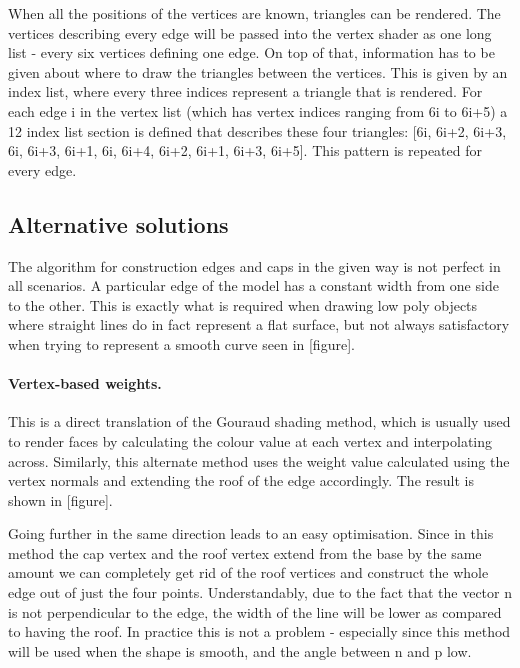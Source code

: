 \documentclass[a4paper, 12pt]{article}
\begin{document}
When all the positions of the vertices are known, triangles can be rendered. The vertices describing every edge will be passed into the vertex shader as one long list - every six vertices defining one edge. On top of that, information has to be given about where to draw the triangles between the vertices. This is given by an index list, where every three indices represent a triangle that is rendered. For each edge i in the vertex list (which has vertex indices ranging from 6i to 6i+5) a 12 index list section is defined that describes these four triangles: [6i, 6i+2, 6i+3, 6i, 6i+3, 6i+1, 6i, 6i+4, 6i+2, 6i+1, 6i+3, 6i+5]. This pattern is repeated for every edge.


\subsection{Alternative solutions}

The algorithm for construction edges and caps in the given way is not perfect in all scenarios. A particular edge of the model has a constant width from one side to the other. This is exactly what is required when drawing low poly objects where straight lines do in fact represent a flat surface, but not always satisfactory when trying to represent a smooth curve seen in [figure].

\paragraph{Vertex-based weights.}
This is a direct translation of the Gouraud shading method, which is usually used to render faces by calculating the colour value at each vertex and interpolating across. Similarly, this alternate method uses the weight value calculated using the vertex normals and extending the roof of the edge accordingly. The result is shown in [figure].

Going further in the same direction leads to an easy optimisation. Since in this method the cap vertex and the roof vertex extend from the base by the same amount we can  completely get rid of the roof vertices and  construct the whole edge out of just the four points. Understandably, due to the fact that the vector n is not perpendicular to the edge, the width of the line will be lower as compared to having the roof. In practice this is not a problem - especially since this method will be used when the shape is smooth, and the angle between n and p low.
\end{document}

